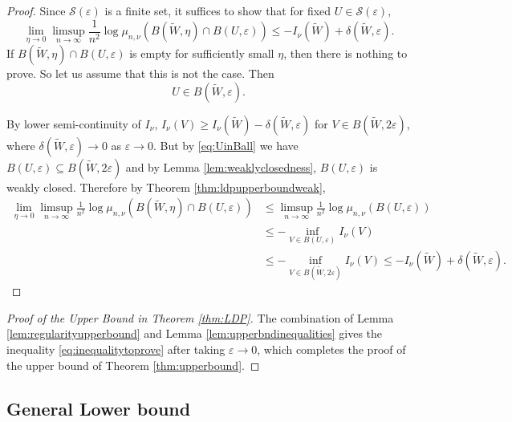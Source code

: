 \documentclass[12pt,twoside,a4paper]{article}
\begin{document}
\begin{proof}
Since $\mathcal{S}(\varepsilon)$ is a finite set, it suffices to show that for fixed $U \in \mathcal{S}(\varepsilon)$,
\[
\lim_{\eta \to 0} \limsup_{n \to \infty} \frac{1}{n^2} \log \mu_{n,\nu}(B(\widetilde{W}, \eta) \cap B(U, \varepsilon)) \leq - I_{\nu}(\widetilde{W}) + \delta(\widetilde{W}, \varepsilon).
\]
If $B(\widetilde{W}, \eta) \cap B(U, \varepsilon)$ is empty for sufficiently small $\eta$, then there is nothing to prove. So let us assume that this is not the case. Then
\begin{equation}\label{eq:UinBall}
U \in B(\widetilde{W}, \varepsilon). 
\end{equation}

By lower semi-continuity of $I_{\nu}$, $I_{\nu}(V) \geq I_{\nu}(\widetilde{W}) - \delta(\widetilde{W}, \varepsilon)$ for $V\in B(\widetilde{W}, 2\varepsilon)$, where $\delta(\widetilde{W}, \varepsilon) \to 0$ as $\varepsilon \to 0$. But by \eqref{eq:UinBall} we have $B(U, \varepsilon) \subseteq B(\widetilde{W}, 2\varepsilon)$ and by Lemma \ref{lem:weaklyclosedness}, $B(U, \varepsilon)$ is weakly closed. Therefore by Theorem \ref{thm:ldpupperboundweak},
\[
\begin{aligned}
\lim_{\eta \to 0} \limsup_{n \to \infty} \frac{1}{n^2} \log \mu_{n,\nu}(B(\widetilde{W}, \eta) \cap B(U, \varepsilon)) 
&\leq \limsup_{n \to \infty} \frac{1}{n^2} \log \mu_{n,\nu}(B(U, \varepsilon)) \\
&\leq - \inf_{V \in B(U, \varepsilon)} I_{\nu}(V) \\
&\leq - \inf_{V \in B(\widetilde{W}, 2\varepsilon)} I_{\nu}(V) \leq - I_{\nu}(\widetilde{W}) + \delta(\widetilde{W}, \varepsilon).
\end{aligned}
\]
\end{proof}

\begin{proof}[Proof of the Upper Bound in Theorem \ref{thm:LDP}]
The combination of Lemma \ref{lem:regularityupperbound} and Lemma \ref{lem:upperbndinequalities} gives the inequality \eqref{eq:inequalitytoprove} after taking $\varepsilon \to 0$, which completes the proof of the upper bound of Theorem \ref{thm:upperbound}.
\end{proof}

\subsection{General Lower bound}
\end{document}

